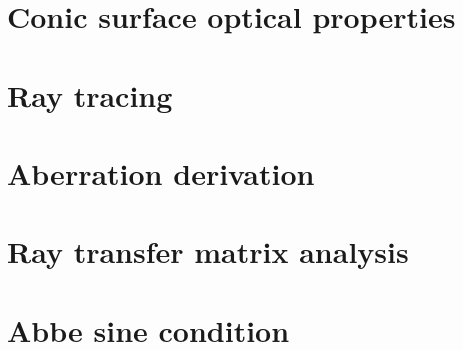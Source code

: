 \documentclass{article}
\begin{document}
	\section{Conic surface optical properties}%

	\newpage
	\section{Ray tracing}
	{\let\section\subsection
	\let\subsection\subsubsection
	
	}

	\section{Aberration derivation}

	\section{Ray transfer matrix analysis}

	\newpage
	\section{Abbe sine condition}
	{\let\section\subsection
	\let\subsection\subsubsection
	
	}
	
\end{document}
